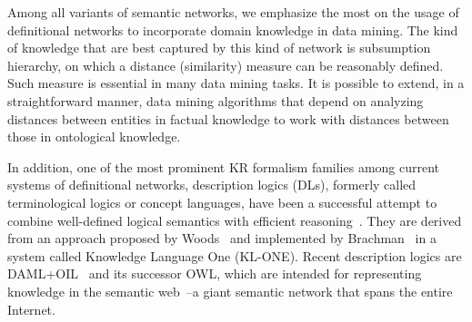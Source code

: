 Among all variants of semantic networks, we emphasize the most on the usage of definitional networks to incorporate domain knowledge in data mining. The kind of knowledge that are best captured by this kind of network is subsumption hierarchy, on which a distance (similarity) measure can be reasonably defined. Such measure is essential in many data mining tasks. It is possible to extend, in a straightforward manner, data mining algorithms that depend on analyzing distances between entities in factual knowledge to work with distances between those in ontological knowledge.

In addition, one of the most prominent KR formalism families among current systems of definitional networks, description logics (DLs), formerly called terminological logics or concept languages, have been a successful attempt to combine well-defined logical semantics with efficient reasoning~\cite{Sowa91principlesof}. They are derived from an approach proposed by Woods~\cite{woods75link} and implemented by Brachman~\cite{Brachman91livingwith} in a system called Knowledge Language One (KL-ONE). %
Recent description logics are DAML+OIL~\cite{Horrocks02daml+oil} and its successor OWL, which are intended for representing knowledge in the semantic web~\cite{Berners-Lee01}--a giant semantic network that spans the entire Internet.

\here

